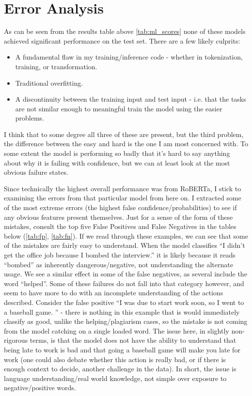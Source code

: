 \documentclass[11pt,a4paper]{article}
\begin{document}
\section{Error Analysis}

As can be seen from the results table above \ref{tab:ml_scores} none of these models achieved significant performance on the test set. There are a few likely culprits:

\begin{itemize}
    \item A fundamental flaw in my training/inference code - whether in tokenization, training, or transformation.
    \item Traditional overfitting.
    \item A discontinuity between the training input and test input - i.e. that the tasks are not similar enough to meaningful train the model using the easier problems.
\end{itemize}

I think that to some degree all three of these are present, but the third problem, the difference between the easy and hard is the one I am most concerned with. To some extent the model is performing so badly that it's hard to say anything about why it is failing with confidence, but we can at least look at the most obvious failure states. 

Since technically the highest overall performance was from RoBERTa, I stick to examining the errors from that particular model from here on. I extracted some of the most extreme errors (the highest false confidence/probabilities) to see if any obvious features present themselves. Just for a sense of the form of these mistakes, consult the top five False Positives and False Negatives in the tables below (\ref{tab:fp}, \ref{tab:fn}). If we read through these examples, we can see that some of the mistakes are fairly easy to understand. When the model classifies ``I didn't get the office job because I bombed the interview.'' it is likely because it reads ``bombed'' as inherently dangerous/negative, not understanding the alternate usage. We see a similar effect in some of the false negatives, as several include the word ``helped''. Some of these failures do not fall into that category however, and seem to have more to do with an incomplete understanding of the actions described. Consider the false positive ``I was due to start work soon, so I went to a baseball game. '' - there is nothing in this example that is would immediately classify as good, unlike the helping/plagiarism cases, so the mistake is not coming from the model catching on a single loaded word. The issue here, in slightly non-rigorous terms, is that the model does not have the ability to understand that being late to work is bad and that going a baseball game will make you late for work (one could also debate whether this action is really bad, or if there is enough context to decide, another challenge in the data). In short, the issue is language understanding/real world knowledge, not simple over exposure to negative/positive words.
\end{document}
